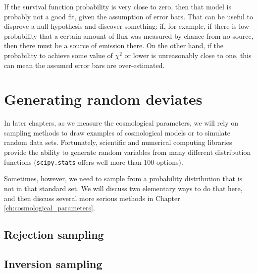 If the survival function probability is very close to zero, then that model is probably not a good fit, given the assumption of error bars.  That can be useful to disprove a null hypothesis and discover something: if, for example, if there is low probability that a certain amount of flux was measured by chance from no source, then there must be a source of emission there.  On the other hand, if the probability to achieve some value of $\chi^2$ or lower is unreasonably close to one, this can mean the assumed error bars are over-estimated.

\section{Generating random deviates}
In later chapters, as we measure the cosmological parameters, we will rely on sampling methods to draw examples of cosmological models or to simulate random data sets.  Fortunately, scientific and numerical computing libraries provide the ability to generate random variables from many different distribution functions (\texttt{scipy.stats} offers well more than 100 options).

Sometimes, however, we need to sample from a probability distribution that is not in that standard set.
We will discuss two elementary ways to do that here, and then discuss several more serious methods in Chapter \ref{ch:cosmological_parameters}.

\subsection{Rejection sampling}

\subsection{Inversion sampling}

\exercises

